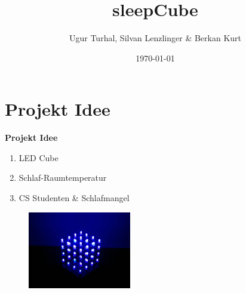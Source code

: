 \documentclass[aspectratio=169]{beamer}
\title{sleepCube}
\author{Ugur Turhal, Silvan Lenzlinger \& Berkan Kurt}
\institute{Universit\"at Basel}
\date{\today}
\begin{document}
\frame{\maketitle}


\section{Projekt Idee}
\begin{frame}[fragile]
\textbf{Projekt Idee}
\begin{enumerate}[(1)]
\item LED Cube
\item Schlaf-Raumtemperatur
\item CS Studenten \& Schlafmangel
\end{enumerate}
\begin{figure}[!h]
\includegraphics[width=0.4\textwidth]{cube.jpg}
 \label{cube} 
\end{figure}
\end{frame}
\end{document}

